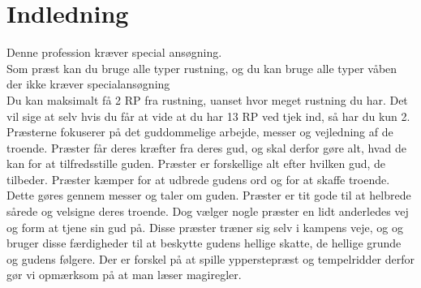 \chapter{Indledning}
Denne profession kræver special ansøgning.\\
Som præst kan du bruge alle typer rustning, og du kan bruge alle typer våben der ikke kræver specialansøgning\\
Du kan maksimalt få 2 RP fra rustning, uanset hvor meget rustning du har. Det vil sige at selv hvis du får at vide at du har 13 RP ved tjek ind, så har du kun 2.\\

Præsterne fokuserer på det guddommelige arbejde, messer og vejledning af de troende.
Præster får deres kræfter fra deres gud, og skal derfor gøre alt, hvad de kan for at tilfredsstille
guden. Præster er forskellige alt efter hvilken gud, de tilbeder. Præster kæmper for at
udbrede gudens ord og for at skaffe troende. Dette gøres gennem messer og taler om
guden. Præster er tit gode til at helbrede sårede og velsigne deres troende. Dog vælger nogle præster
en lidt anderledes vej og form at tjene sin gud på. Disse præster træner sig selv i kampens veje, og og
bruger disse færdigheder til at beskytte gudens hellige skatte, de hellige grunde og gudens følgere.
Der er forskel på at spille ypperstepræst og tempelridder derfor gør vi opmærksom på at man
læser magiregler.


